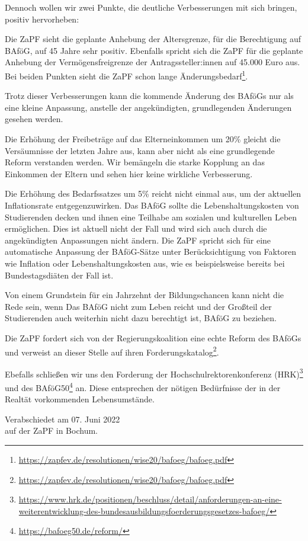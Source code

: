 \documentclass[DIV=calc]{scrartcl}
\let\oldgrqq=\grqq
\def\grqq{\oldgrqq\xspace}
\begin{document}
Dennoch wollen wir zwei Punkte, die deutliche Verbesserungen mit sich bringen, positiv hervorheben:

Die ZaPF sieht die geplante Anhebung der Altersgrenze, für die Berechtigung auf BAföG, auf 45 Jahre sehr positiv. Ebenfalls spricht sich die ZaPF für die geplante Anhebung der Vermögensfreigrenze der Antragssteller:innen auf 45.000 Euro aus. Bei beiden Punkten sieht die ZaPF schon lange Änderungsbedarf\footnote{\label{bafögreso}\url{https://zapfev.de/resolutionen/wise20/bafoeg/bafoeg.pdf}}.

Trotz dieser Verbesserungen kann die kommende Änderung des BAföGs nur als eine kleine Anpassung, anstelle der angekündigten, grundlegenden Änderungen gesehen werden. 

Die Erhöhung der Freibeträge auf das Elterneinkommen um 20\% gleicht die Versäumnisse der letzten Jahre aus, kann aber nicht als eine grundlegende Reform verstanden werden. Wir bemängeln die starke Kopplung an das Einkommen der Eltern und sehen hier keine wirkliche Verbesserung.

Die Erhöhung des Bedarfssatzes um 5\% reicht nicht einmal aus, um der aktuellen Inflationsrate entgegenzuwirken. Das BAföG sollte die Lebenshaltungskosten von Studierenden decken und ihnen eine Teilhabe am sozialen und kulturellen Leben ermöglichen. Dies ist aktuell nicht der Fall und wird sich auch durch die angekündigten Anpassungen nicht ändern. Die ZaPF spricht sich für eine automatische Anpassung der BAföG-Sätze unter Berücksichtigung von Faktoren wie Inflation oder Lebenshaltungskosten aus, wie es beispielsweise bereits bei Bundestagsdiäten der Fall ist.

 Von einem \glqq Grundstein für ein Jahrzehnt der Bildungschancen\grqq kann nicht die Rede sein, wenn Das BAföG nicht zum Leben reicht und der Großteil der Studierenden auch weiterhin nicht dazu berechtigt ist, BAföG zu beziehen.

Die ZaPF fordert sich von der Regierungskoalition eine echte Reform des BAföGs und verweist an dieser Stelle auf ihren Forderungskatalog\footnote{\label{bafögreso}\url{https://zapfev.de/resolutionen/wise20/bafoeg/bafoeg.pdf}}.

Ebefalls schließen wir uns den Forderung der Hochschulrektorenkonferenz (HRK)\footnote{\url{https://www.hrk.de/positionen/beschluss/detail/anforderungen-an-eine-weiterentwicklung-des-bundesausbildungsfoerderungsgesetzes-bafoeg/}} und des BAföG50\footnote{\url{https://bafoeg50.de/reform/}} an. Diese entsprechen der nötigen Bedürfnisse der in der Realtät vorkommenden Lebensumstände.





\vspace{1cm} 

\vfill
\begin{flushright}
	Verabschiedet am 07. Juni 2022 \\
	auf der ZaPF in Bochum.
\end{flushright}
\end{document}
